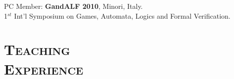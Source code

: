 \begin{resume}
\begin{list1}
\item
PC Member: {\bf GandALF 2010}, Minori, Italy.\\
1$^{st}$ Int'l Symposium on Games, Automata, Logics and Formal Verification.

\end{list1}




\section{\bfseries \scshape  Teaching \\Experience}



\end{resume}
